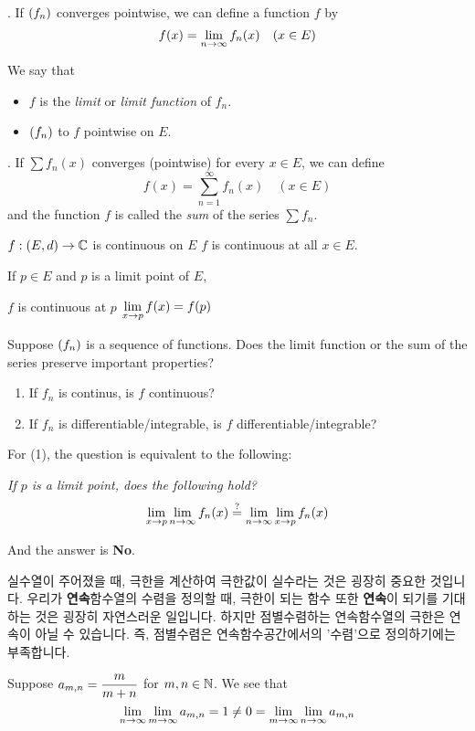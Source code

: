 . If \(\left( f_n \right)\) converges pointwise, we can define a function \(f\) by
\[
    f(x) = \lim_{n \rightarrow \infty} f_n(x) \quad (x\in E)
\]

We say that
\begin{itemize}
    \item \(f\) is the \textit{limit} or \textit{limit function} of \(f_n\).
    \item \(\left( f_n \right)\) to \(f\) pointwise on \(E\).
\end{itemize}

. If \(\sum f_n(x)\) converges (pointwise) for every \(x \in E\), we can define
\[
    f(x) = \sum_{n=1}^\infty f_n(x) \quad (x \in E)
\]
and the function \(f\) is called the \textit{sum} of the series \(\sum f_n\).

\recall \(f: (E, d) \rightarrow \mathbb{C}\) is continuous on \(E\) \miff \(f\) is continuous at all \(x \in E\).

\recall {} If \(p \in E\) and \(p\) is a limit point of \(E\),
\begin{center}
    \(f\) is continuous at \(p\) \miff \(\displaystyle \lim_{x \rightarrow p} f(x) = f(p)\)
\end{center}

\question Suppose \(\left( f_n \right)\) is a sequence of functions. Does the limit function or the sum of the series preserve important properties?
\begin{enumerate}
    \item If \(f_n\) is continus, is \(f\) continuous?
    \item If \(f_n\) is differentiable/integrable, is \(f\) differentiable/integrable?
\end{enumerate}

For (1), the question is equivalent to the following:

\textit{If \(p\) is a limit point, does the following hold?}
\[
    \lim_{x\rightarrow p} \lim_{n\rightarrow \infty} f_n(x) \overset{?}{=} \lim_{n\rightarrow \infty} \lim_{x\rightarrow p}f_n(x)
\]

And the answer is \textbf{No}.

실수열이 주어졌을 때, 극한을 계산하여 극한값이 실수라는 것은 굉장히 중요한 것입니다. 우리가 \textbf{연속}함수열의 수렴을 정의할 때, 극한이 되는 함수 또한 \textbf{연속}이 되기를 기대하는 것은 굉장히 자연스러운 일입니다. 하지만 점별수렴하는 연속함수열의 극한은 연속이 아닐 수 있습니다. 즉, 점별수렴은 연속함수공간에서의 '수렴'으로 정의하기에는 부족합니다.

 Suppose \(\displaystyle a_{m, n} = \frac{m}{m + n}\) for \(m, n\in \mathbb{N}\). We see that
\[
    \lim_{n \rightarrow \infty} \lim_{m \rightarrow \infty} a_{m, n} = 1 \neq 0 = \lim_{m \rightarrow \infty} \lim_{n \rightarrow \infty} a_{m, n}
\]

